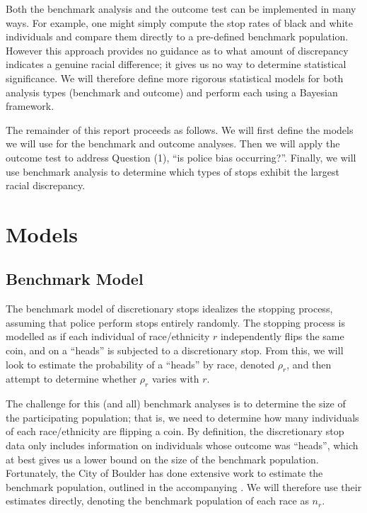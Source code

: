\documentclass[11pt]{article}
\begin{document}
Both the benchmark analysis and the outcome test can be implemented in many ways. For example, one might simply compute the stop rates of black and white individuals and compare them directly to a pre-defined benchmark population. However this approach provides no guidance as to what amount of discrepancy indicates a genuine racial difference; it gives us no way to determine statistical significance. We will therefore define more rigorous statistical models for both analysis types (benchmark and outcome) and perform each using a Bayesian framework.

The remainder of this report proceeds as follows. We will first define the models we will use for the benchmark and outcome analyses. Then we will apply the outcome test to address Question (1), ``is police bias occurring?''. Finally, we will use benchmark analysis to determine which types of stops exhibit the largest racial discrepancy.

\section{Models}
\label{sec:mods}

\subsection{Benchmark Model}
\label{subsec:bench}
The benchmark model of discretionary stops idealizes the stopping process, assuming that police perform stops entirely randomly. The stopping process is modelled as if each individual of race/ethnicity $r$ independently flips the same coin, and on a ``heads'' is subjected to a discretionary stop. From this, we will look to estimate the probability of a ``heads'' by race, denoted $\rho_r$, and then attempt to determine whether $\rho_r$ varies with $r$.

The challenge for this (and all) benchmark analyses is to determine the size of the participating population; that is, we need to determine how many individuals of each race/ethnicity are flipping a coin. By definition, the discretionary stop data only includes information on individuals whose outcome was ``heads'', which at best gives us a lower bound on the size of the benchmark population. Fortunately, the City of Boulder has done extensive work to estimate the benchmark population, outlined in the accompanying \cite{report}. We will therefore use their estimates directly, denoting the benchmark population of each race as $n_r$.
\end{document}
